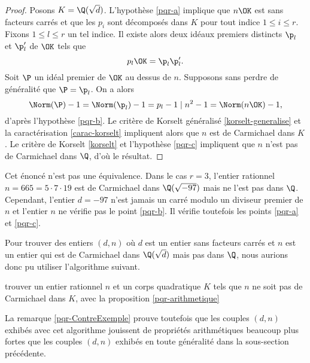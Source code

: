 \begin{proof}
	Posons $K=\Q(\sqrt{d})$. L'hypothèse \ref{pqr-a} implique que $n\OK$ est sans facteurs carrés et que les $p_i$ sont décomposés dans $K$ pour tout indice $1\leq i \leq r$. Fixons $1\leq l \leq r$ un tel indice. Il existe alors deux idéaux premiers distincts $\p_l$ et $\p_l'$ de $\OK$ tels que \[p_l\OK = \p_l\p_l'.\] Soit $\P$ un idéal premier de $\OK$ au dessus de $n$. Supposons sans perdre de généralité que $\P = \p_l$. On a alors \[\Norm(\P) - 1 = \Norm(\p_l) - 1 = p_l - 1\mid n^2 - 1 = \Norm(n\OK) - 1,\] d'après l'hypothèse \ref{pqr-b}. Le critère de Korselt généralisé \ref{korselt-generalise} et la caractérisation \ref{carac-korselt} impliquent alors que $n$ est de Carmichael dans $K$. Le critère de Korselt \ref{korselt} et l'hypothèse \ref{pqr-c} impliquent que $n$ n'est pas de Carmichael dans $\Q$, d'où le résultat.
\end{proof}

\begin{remarque}\label{pqr-ContreExemple}
	Cet énoncé n'est pas une équivalence. Dans le cas $r=3$, l'entier rationnel $n=665 = 5\cdot 7 \cdot 19$ est de Carmichael dans $\Q(\sqrt{-97})$ mais ne l'est pas dans $\Q$. Cependant, l'entier $d = -97$ n'est jamais un carré modulo un diviseur premier de $n$ et l'entier $n$ ne vérifie pas le point \ref{pqr-b}. Il vérifie toutefois les points \ref{pqr-a} et \ref{pqr-c}.
\end{remarque}

Pour trouver des entiers $(d, n)$ où $d$ est un entier sans facteurs carrés et $n$ est un entier qui est de Carmichael dans $\Q(\sqrt{d})$ mais pas dans $\Q$, nous aurions donc pu utiliser l'algorithme suivant.

\vspace{1em}
\begin{algorithm}[H]
\caption{trouver un entier rationnel $n$ et un corps quadratique $K$ tels que $n$ ne soit pas de Carmichael dans $K$, avec la proposition \ref{pqr-arithmetique}}
\end{algorithm}
\vspace{1em}

La remarque \ref{pqr-ContreExemple} prouve toutefois que les couples $(d, n)$ exhibés avec cet algorithme jouissent de propriétés arithmétiques beaucoup plus fortes que les couples $(d, n)$ exhibés en toute généralité dans la sous-section précédente.
